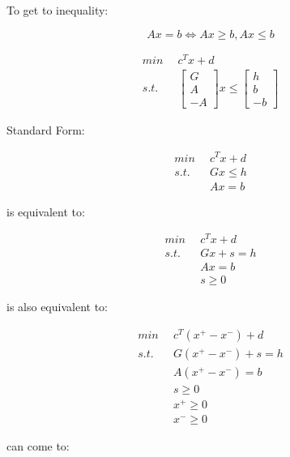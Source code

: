 To get to inequality:

\begin{equation*}
Ax = b \Leftrightarrow Ax\geq b, Ax\leq b
\end{equation*}

\begin{align*}
min\,\,\, &c^Tx +d\\
s.t. &\begin{bmatrix}
G\\
A\\
-A
\end{bmatrix} x\leq
\begin{bmatrix}
h\\
b\\
-b
\end{bmatrix}
\end{align*}

Standard Form:

\begin{align*}
min \,\,\, &c^Tx+d\\
s.t. \,\,\, &Gx\leq h\\
&Ax = b
\end{align*}

is equivalent to:

\begin{align*}
min \,\,\, &c^Tx+d\\
s.t. \,\,\, &Gx + s = h\\
&Ax = b\\
&s\geq 0
\end{align*}

is also equivalent to:

\begin{align*}
min \,\,\, &c^T(x^{+} - x^{-})+d\\
s.t. \,\,\, &G(x^{+} - x^{-}) + s = h\\
&A(x^{+} - x^{-}) = b\\
&s\geq 0\\
&x^{+}\geq 0\\
&x^{-}\geq 0
\end{align*}

can come to:

